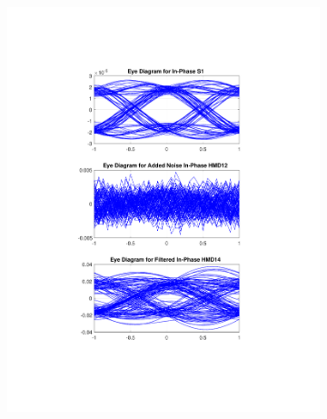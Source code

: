 \begin{figure}[H]
	\centering
	\begin{subfigure}{.45\textwidth}
		\centering
		\includegraphics[clip, trim=5cm 4cm 5cm 4cm, width=\textwidth]{./sdf/m_qam_system/figures/eyes/if_p_60_03.pdf}
	\end{subfigure}
	\begin{subfigure}{.45\textwidth}
		\centering

\end{subfigure}
\end{figure}
